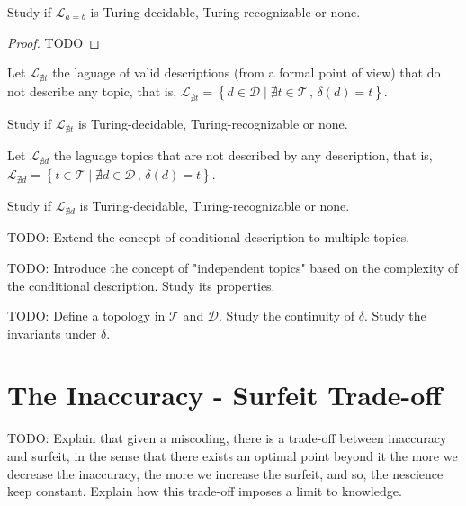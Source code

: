 \begin{proposition}
Study if $\mathcal{L}_{a=b}$ is Turing-decidable, Turing-recognizable or none.
\end{proposition}
\begin{proof}
{\color{red} TODO}
\end{proof}

Let $\mathcal{L}_{\nexists t}$ the laguage of valid descriptions (from a formal point of view) that do not describe any topic, that is, $\mathcal{L}_{\nexists t}=\left\{ d\in\mathcal{D}\mid\nexists t\in\mathcal{T}\,,\,\delta\left(d\right)=t\right\}$.

\begin{proposition}
Study if $\mathcal{L}_{\nexists t}$ is Turing-decidable, Turing-recognizable or none.
\end{proposition}

Let $\mathcal{L}_{\nexists d}$ the laguage topics that are not described by any description, that is, $\mathcal{L}_{\nexists d}=\left\{ t\in\mathcal{T}\mid\nexists d\in\mathcal{D}\,,\,\delta\left(d\right)=t\right\}$.

\begin{proposition}
Study if $\mathcal{L}_{\nexists d}$ is Turing-decidable, Turing-recognizable or none.
\end{proposition}

{\color{red} TODO: Extend the concept of conditional description to multiple topics.}

{\color{red} TODO: Introduce the concept of "independent topics" based on the complexity of the conditional description. Study its properties.}

{\color{red} TODO: Define a topology in $\mathcal{T}$ and $\mathcal{D}$. Study the continuity of $\delta$. Study the invariants under $\delta$.}


%
%

\section{The Inaccuracy - Surfeit Trade-off}

{\color{red} TODO: Explain that given a miscoding, there is a trade-off between inaccuracy and surfeit, in the sense that there exists an optimal point beyond it the more we decrease the inaccuracy, the more we increase the surfeit, and so, the nescience keep constant. Explain how this trade-off imposes a limit to knowledge.}

